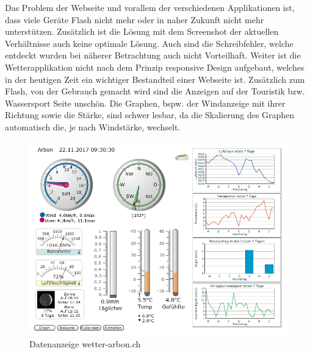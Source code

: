 Das Problem der Webseite und vorallem der verschiedenen Applikationen ist, dass viele Geräte Flash nicht mehr oder in naher Zukunft nicht mehr unterstützen. Zusätzlich ist die Lösung mit dem Screenshot der aktuellen Verhältnisse auch keine optimale Lösung. Auch sind die Schreibfehler, welche entdeckt wurden bei näherer Betrachtung auch nicht Vorteilhaft. Weiter ist die Wetterapplikation nicht nach dem Prinzip responsive Design aufgebaut, welches in der heutigen Zeit ein wichtiger Bestandteil einer Webseite ist. Zusätzlich zum Flash, von der Gebrauch gemacht wird sind die Anzeigen auf der Touristik bzw. Wassersport Seite unschön. Die Graphen, bspw. der Windanzeige mit ihrer Richtung sowie die Stärke, sind schwer lesbar, da die Skalierung des Graphen automatisch die, je nach Windstärke, wechselt.

\begin{figure}[htbp]
	\centering
	\includegraphics[width=0.9\linewidth]{img/grafik}
	\caption{Datenanzeige wetter-arbon.ch}
	\label{img:grafik-dummy}
\end{figure}

